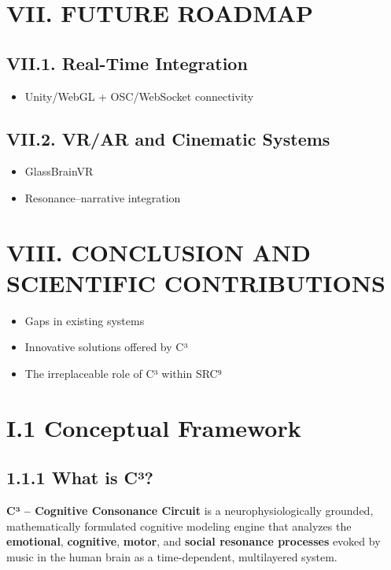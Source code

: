 \documentclass[10pt]{article}
\begin{document}
\section*{VII. FUTURE ROADMAP}

\subsection*{VII.1. Real-Time Integration}

\begin{itemize}
    \item Unity/WebGL + OSC/WebSocket connectivity
\end{itemize}

\subsection*{VII.2. VR/AR and Cinematic Systems}

\begin{itemize}
    \item GlassBrainVR
    \item Resonance–narrative integration
\end{itemize}

\section*{VIII. CONCLUSION AND SCIENTIFIC CONTRIBUTIONS}

\begin{itemize}
    \item Gaps in existing systems
    \item Innovative solutions offered by C³
    \item The irreplaceable role of C³ within SRC⁹
\end{itemize}

\section*{I.1 Conceptual Framework}

\subsection*{1.1.1 What is C³?}

\textbf{C³ – Cognitive Consonance Circuit} is a neurophysiologically grounded, mathematically formulated cognitive modeling engine that analyzes the \textbf{emotional}, \textbf{cognitive}, \textbf{motor}, and \textbf{social resonance processes} evoked by music in the human brain as a time-dependent, multilayered system.
\end{document}
